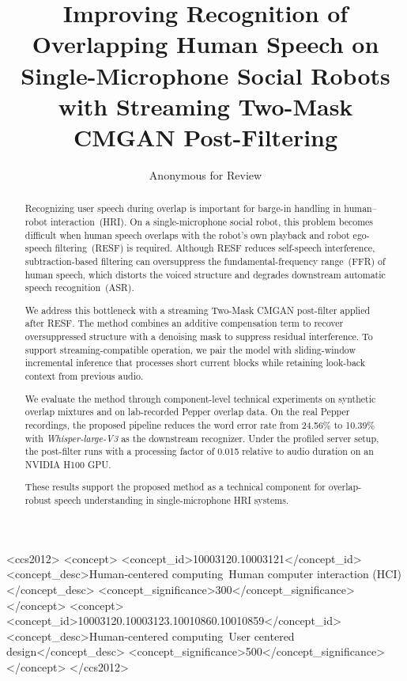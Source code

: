 \documentclass[manuscript,screen,review]{acmart}
\begin{document}
\title{Improving Recognition of Overlapping Human Speech on Single-Microphone Social Robots with Streaming Two-Mask CMGAN Post-Filtering}

\author{Anonymous for Review}

\begin{abstract}
Recognizing user speech during overlap is important for barge-in handling in human--robot interaction~(HRI). On a single-microphone social robot, this problem becomes difficult when human speech overlaps with the robot's own playback and robot ego-speech filtering~(RESF) is required. Although RESF reduces self-speech interference, subtraction-based filtering can oversuppress the fundamental-frequency range~(FFR) of human speech, which distorts the voiced structure and degrades downstream automatic speech recognition~(ASR).

We address this bottleneck with a streaming Two-Mask CMGAN post-filter applied after RESF. The method combines an additive compensation term to recover oversuppressed structure with a denoising mask to suppress residual interference. To support streaming-compatible operation, we pair the model with sliding-window incremental inference that processes short current blocks while retaining look-back context from previous audio.

We evaluate the method through component-level technical experiments on synthetic overlap mixtures and on lab-recorded Pepper overlap data. On the real Pepper recordings, the proposed pipeline reduces the word error rate from 24.56\% to 10.39\% with \textit{Whisper-large-V3} as the downstream recognizer. Under the profiled server setup, the post-filter runs with a processing factor of 0.015 relative to audio duration on an NVIDIA H100 GPU.

These results support the proposed method as a technical component for overlap-robust speech understanding in single-microphone HRI systems.
\end{abstract}

\begin{CCSXML}
<ccs2012>
   <concept>
       <concept_id>10003120.10003121</concept_id>
       <concept_desc>Human-centered computing~Human computer interaction (HCI)</concept_desc>
       <concept_significance>300</concept_significance>
       </concept>
   <concept>
       <concept_id>10003120.10003123.10010860.10010859</concept_id>
       <concept_desc>Human-centered computing~User centered design</concept_desc>
       <concept_significance>500</concept_significance>
       </concept>
 </ccs2012>
\end{CCSXML}
\end{document}

